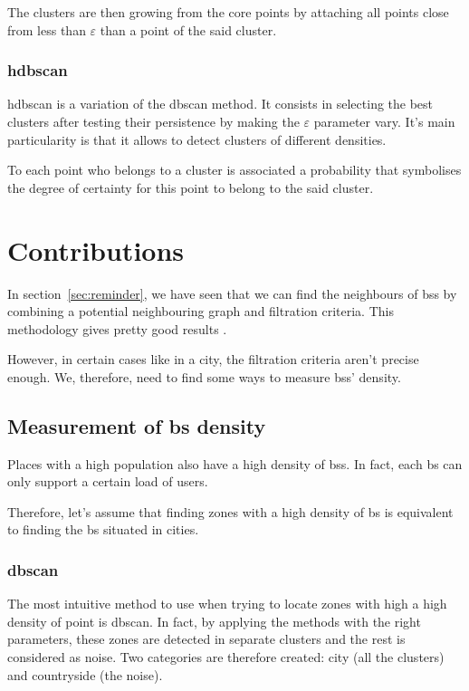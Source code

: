 \documentclass[lettersize,journal,english]{IEEEtran}
\begin{document}
            The clusters are then \og growing\fg{} from the core points by attaching all points close from less than $\varepsilon$ than a point of the said cluster.

        \subsubsection{\acrshort{hdbscan}}
            \acrshort{hdbscan} \cite{10.1007/978-3-642-37456-2_14} is a variation of the \acrshort{dbscan} method.
            It consists in selecting the best clusters after testing their persistence by making the $\varepsilon$ parameter vary. It's main particularity is that it allows to detect clusters of different densities.

            To each point who belongs to a cluster is associated a probability that symbolises the degree of certainty for this point to belong to the said cluster.

\section{Contributions\label{sec:contrib}}
    \noindent In section~\ref{sec:reminder}, we have seen that we can find the neighbours of \acrshort{bs}s by combining a potential neighbouring graph and filtration criteria. This methodology gives pretty good results \cite{art_del_paq}.

    However, in certain cases like in a city, the filtration criteria aren't precise enough. We, therefore, need to find some ways to measure \acrshort{bs}s' density.

    \subsection{Measurement of \acrshort{bs} density}
        Places with a high population also have a high density of \acrshort{bs}s. In fact, each \acrshort{bs} can only support a certain load of users.

        Therefore, let's assume that finding zones with a high density of \acrshort{bs} is equivalent to finding the \acrshort{bs} situated in \og cities\fg{}.

        \subsubsection{\acrshort{dbscan}}
            The most intuitive method to use when trying to locate zones with high a high density of point is \acrshort{dbscan}. In fact, by applying the methods with the right parameters, these zones are detected in separate clusters and the rest is considered as noise. Two categories are therefore created: city (all the clusters) and countryside (the noise).
\end{document}
